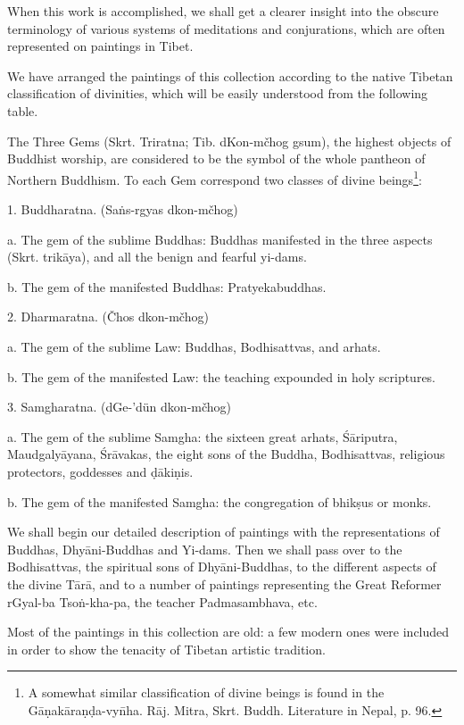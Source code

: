 \documentclass[a4paper, 12pt, oneside]{article}
\begin{document}
When this work is accomplished, we shall get a clearer insight into the obscure terminology of various systems of meditations and conjurations, which are often represented on paintings in Tibet.

We have arranged the paintings of this collection according to the native Tibetan classification of divinities, which will be easily understood from the following table.

The Three Gems (Skrt. Triratna; Tib. dKon-mčhog gsum), the highest objects of Buddhist worship, are considered to be the symbol of the whole pantheon of Northern Buddhism. To each Gem correspond two classes of divine beings\footnote{A somewhat similar classification of divine beings is found in the G\={a}\d{n}ak\={a}ra\d{n}\d{d}a-vy\={n}ha. R\={a}j. Mitra, Skrt. Buddh. Literature in Nepal, p. 96.}:

1. Buddharatna. (Sa\.{n}s-rgyas dkon-mčhog)

a. The gem of the sublime Buddhas: Buddhas manifested in the three aspects (Skrt. trik\={a}ya), and all the benign and fearful yi-dams.

b. The gem of the manifested Buddhas: Pratyekabuddhas.

2. Dharmaratna. (Čhos dkon-mčhog)

a. The gem of the sublime Law: Buddhas, Bodhisattvas, and arhats.

b. The gem of the manifested Law: the teaching expounded in holy scriptures.

3. Samgharatna. (dGe-'dün dkon-mčhog)

a. The gem of the sublime Samgha: the sixteen great arhats, \'{S}\={a}riputra, Maudgaly\={a}yana, \'{S}r\={a}vakas, the eight sons of the Buddha, Bodhisattvas, religious protectors, goddesses and \d{d}\={a}ki\d{n}is.

b. The gem of the manifested Samgha: the congregation of bhik\d{s}us or monks.

We shall begin our detailed description of paintings with the representations of Buddhas, Dhy\={a}ni-Buddhas and Yi-dams. Then we shall pass over to the Bodhisattvas, the spiritual sons of Dhy\={a}ni-Buddhas, to the different aspects of the divine T\={a}r\={a}, and to a number of paintings representing the Great Reformer rGyal-ba Tso\.{n}-kha-pa, the teacher Padmasambhava, etc.

Most of the paintings in this collection are old: a few modern ones were included in order to show the tenacity of Tibetan artistic tradition.
\end{document}
